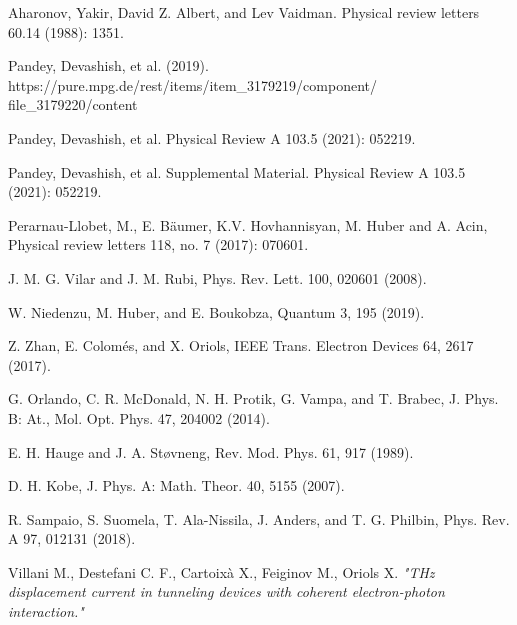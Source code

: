 \documentclass[11pt, a4paper]{article} %
\begin{document}
\begin{thebibliography}{1}
{
Aharonov, Yakir, David Z. Albert, and Lev Vaidman. Physical review letters 60.14 (1988): 1351.

Pandey, Devashish, et al. (2019). {\footnotesize https://pure.mpg.de/rest/items/item\_3179219/component/\\ file\_3179220/content}

Pandey, Devashish, et al. Physical Review A 103.5 (2021): 052219.

Pandey, Devashish, et al. Supplemental Material. Physical Review A 103.5 (2021): 052219.

Perarnau-Llobet, M., E. Bäumer, K.V. Hovhannisyan, M. Huber and A. Acin, Physical review letters 118, no. 7 (2017): 070601.

J. M. G. Vilar and J. M. Rubi, Phys. Rev. Lett. 100, 020601 (2008).

W. Niedenzu, M. Huber, and E. Boukobza, Quantum 3, 195 (2019).

Z. Zhan, E. Colomés, and X. Oriols, IEEE Trans. Electron Devices 64, 2617 (2017).

G. Orlando, C. R. McDonald, N. H. Protik, G. Vampa, and T. Brabec, J. Phys. B: At., Mol. Opt. Phys. 47, 204002 (2014).

E. H. Hauge and J. A. Støvneng, Rev. Mod. Phys. 61, 917 (1989).

D. H. Kobe, J. Phys. A: Math. Theor. 40, 5155 (2007).

R. Sampaio, S. Suomela, T. Ala-Nissila, J. Anders, and T. G. Philbin, Phys. Rev. A 97, 012131 (2018).

Villani M., Destefani C. F., Cartoixà X., Feiginov M., Oriols X. {\em "THz displacement current in tunneling devices with coherent electron-photon
interaction."}

}
\end{thebibliography}
\end{document}
